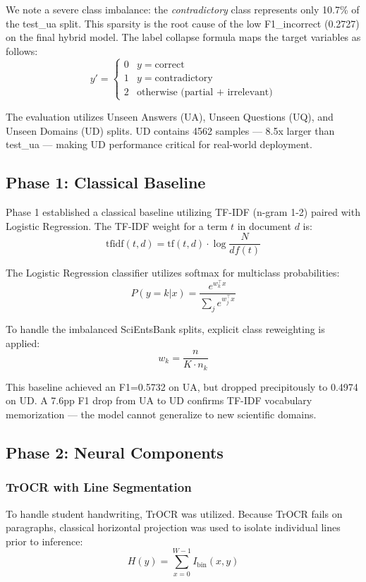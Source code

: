 \documentclass[conference]{IEEEtran}
\begin{document}
We note a severe class imbalance: the \textit{contradictory} class represents only 10.7\% of the test\_ua split. This sparsity is the root cause of the low F1\_incorrect (0.2727) on the final hybrid model. The label collapse formula maps the target variables as follows:
\begin{equation}
y' = \begin{cases}
0 & y = \text{correct} \\
1 & y = \text{contradictory} \\
2 & \text{otherwise (partial + irrelevant)}
\end{cases}
\end{equation}

The evaluation utilizes Unseen Answers (UA), Unseen Questions (UQ), and Unseen Domains (UD) splits. UD contains 4562 samples — 8.5x larger than test\_ua — making UD performance critical for real-world deployment.

\subsection{Phase 1: Classical Baseline}
Phase 1 established a classical baseline utilizing TF-IDF (n-gram 1-2) paired with Logistic Regression. The TF-IDF weight for a term $t$ in document $d$ is:
\begin{equation}
\text{tfidf}(t,d) = \text{tf}(t,d) \cdot \log\frac{N}{df(t)}
\end{equation}

The Logistic Regression classifier utilizes softmax for multiclass probabilities:
\begin{equation}
P(y=k|x) = \frac{e^{w_k^\top x}}{\sum_j e^{w_j^\top x}}
\end{equation}

To handle the imbalanced SciEntsBank splits, explicit class reweighting is applied:
\begin{equation}
w_k = \frac{n}{K \cdot n_k}
\end{equation}

This baseline achieved an F1=0.5732 on UA, but dropped precipitously to 0.4974 on UD. A 7.6pp F1 drop from UA to UD confirms TF-IDF vocabulary memorization — the model cannot generalize to new scientific domains.

\subsection{Phase 2: Neural Components}

\subsubsection{TrOCR with Line Segmentation}
To handle student handwriting, TrOCR was utilized. Because TrOCR fails on paragraphs, classical horizontal projection was used to isolate individual lines prior to inference:
\begin{equation}
H(y) = \sum_{x=0}^{W-1} I_{\text{bin}}(x,y)
\end{equation}
\end{document}
